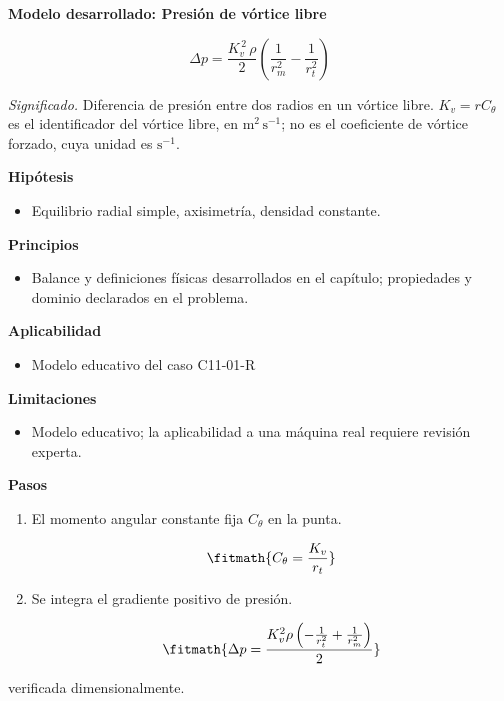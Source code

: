 \documentclass[10pt,openany]{book}
\begin{document}
\begin{tcolorbox}[title={Desarrollos del modelo}, studiumdef, breakable]

\noindent\textbf{Modelo desarrollado: Presión de vórtice libre}

\begin{equation}
\Delta p=\frac{K_v^{\,2}\,\rho}{2}\left(\frac{1}{r_m^2}-\frac{1}{r_t^2}\right)
\label{eq:EC-C11}
\end{equation}

\noindent\textit{Significado.} Diferencia de presión entre dos radios en un vórtice libre. $K_v=rC_\theta$ es el identificador del vórtice libre, en $\mathrm{m^2\,s^{-1}}$; no es el coeficiente de vórtice forzado, cuya unidad es $\mathrm{s^{-1}}$.

\noindent\textbf{Hipótesis}
\begin{itemize}
\item Equilibrio radial simple, axisimetría, densidad constante.
\end{itemize}

\noindent\textbf{Principios}
\begin{itemize}
\item Balance y definiciones físicas desarrollados en el capítulo; propiedades y dominio declarados en el problema.
\end{itemize}

\noindent\textbf{Aplicabilidad}
\begin{itemize}
\item Modelo educativo del caso C11-01-R
\end{itemize}

\noindent\textbf{Limitaciones}
\begin{itemize}
\item Modelo educativo; la aplicabilidad a una máquina real requiere revisión experta.
\end{itemize}

\noindent\textbf{Pasos}
\begin{enumerate}
\item
El momento angular constante fija $C_\theta$ en la punta.

\[
\fitmath{C_\theta=\frac{K_v}{r_t}}
\]
\item
Se integra el gradiente positivo de presión.

\[
\fitmath{\Delta p=\frac{K_v^{2} \rho \left(- \frac{1}{r_t^{2}} + \frac{1}{r_m^{2}}\right)}{2}}
\]
\end{enumerate}

{\noindent\footnotesize verificada dimensionalmente.\par}
\end{tcolorbox}
\end{document}
